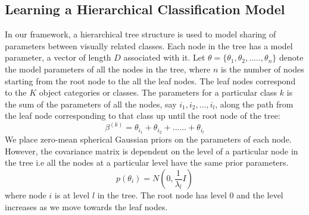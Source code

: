 \documentclass[10pt,twocolumn,letterpaper]{article}
\begin{document}
 
 \subsection{Learning a Hierarchical Classification Model}
 In our framework, a hierarchical tree structure is used to model sharing of parameters between 
 visually related classes. Each node in the tree has a model parameter, a vector of length $D$ 
 associated with it.  Let $ \theta = \{ \theta_{1}, \theta_{2},.....,\theta_{n}\} $ denote the model parameters 
 of all the nodes in the tree, where $n$ is the number of nodes starting from the root node to the all the leaf nodes.
 The leaf nodes correspond to the $K$ object categories or classes. The parameters for a particular class $k$
 is the sum of the parameters of all the nodes, say $i_{1}, i_{2}, ..., i_{l} $, along the path from the leaf node
 corresponding to that class up until the root node of the tree:
 \begin{equation} \label{beta-theta-rel}
 \beta^{(k)} = \theta_{i_{1}} +  \theta_{i_{2}} + ...... + \theta_{i_{l}}
  \end{equation} 
 We place zero-mean spherical Gaussian priors on the parameters of each node. However, the 
 covariance matrix is dependent on the level of a particular node in the tree i.e all the nodes at
 a particular level have the same prior parameters.
 \begin{equation}
 p(\theta_{i})  = N(0,\frac{1}{\lambda_{l}}I) 
\end{equation}   
where node $i$ is at level $l$ in the tree. The root node has level 0 and the level increases as 
we move towards the leaf nodes.
\end{document}
